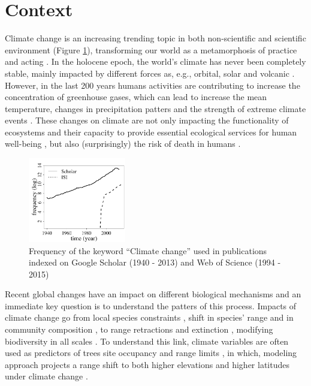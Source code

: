 \section{Context}

Climate change is an increasing trending topic in both non-scientific \parencite{Capstick2015} and scientific environment (Figure \ref{fig:fig1}), transforming our world as a metamorphosis of practice and acting \parencite{Beck2016}.
In the holocene epoch, the world's climate has never been completely stable, mainly impacted by different forces as, e.g., orbital, solar and volcanic \parencite{Wanner2008}.
However, in the last 200 years humans activities are contributing to increase the concentration of greenhouse gases, which can lead to increase the mean temperature, changes in precipitation patters and the strength of extreme climate events \parencite{Cubasch2013}.
These changes on climate are not only impacting the functionality of ecosystems and their capacity to provide essential ecological services for human well-being \parencite{Cardinale2012}, but also (surprisingly) the risk of death in humans \parencite{Mora2017}.

\begin{figure}
    \centering
    \includegraphics[width=0.38\textwidth]{img/fig1_em.pdf}
    \caption{Frequency of the keyword ``Climate change'' used in publications indexed on Google Scholar (1940 - 2013) and Web of Science (1994 - 2015)}
    \label{fig:fig1}
\end{figure}

Recent global changes have an impact on different biological mechanisms and an immediate key question is to understand the patters of this process.
Impacts of climate change go from local species constraints \parencite[e.g. low regeneration;][]{Treyger2011}, shift in species' range \parencite{Boisvert-Marsh2014,Monleon2015} and in community composition \parencite{Dieleman2015}, to range retractions and extinction \parencite{Thomas2006}, modifying biodiversity in all scales \parencite{Penuelas2013}.
To understand this link, climate variables are often used as predictors of trees site occupancy \parencite{Canham2010} and range limits \parencite{Morin2015}, in which, modeling approach projects a range shift to both higher elevations and higher latitudes under climate change \parencite{Chen2011}.

